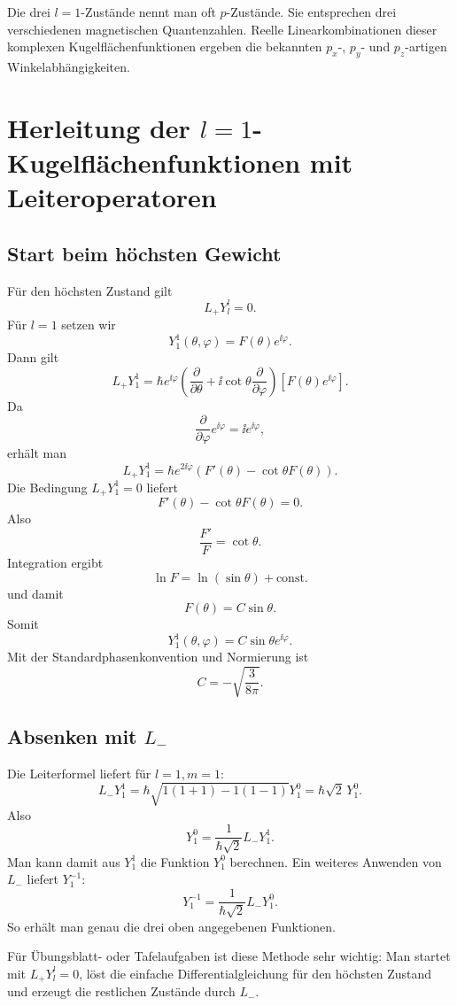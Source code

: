 \begin{notebox}
Die drei \(l=1\)-Zustände nennt man oft \(p\)-Zustände. Sie entsprechen drei verschiedenen magnetischen Quantenzahlen. Reelle Linearkombinationen dieser komplexen Kugelflächenfunktionen ergeben die bekannten \(p_x\)-, \(p_y\)- und \(p_z\)-artigen Winkelabhängigkeiten.
\end{notebox}

\section{Herleitung der \(l=1\)-Kugelflächenfunktionen mit Leiteroperatoren}

\subsection{Start beim höchsten Gewicht}

Für den höchsten Zustand gilt
\[
    L_+Y_l^l=0.
\]
Für \(l=1\) setzen wir
\[
    Y_1^1(\theta,\varphi)=F(\theta)e^{\ii\varphi}.
\]
Dann gilt
\[
    L_+Y_1^1
    =\hbar e^{\ii\varphi}\left(\frac{\partial}{\partial\theta}
    +\ii\cot\theta\frac{\partial}{\partial\varphi}\right)
    \left[F(\theta)e^{\ii\varphi}\right].
\]
Da
\[
    \frac{\partial}{\partial\varphi}e^{\ii\varphi}=\ii e^{\ii\varphi},
\]
erhält man
\[
    L_+Y_1^1
    =\hbar e^{2\ii\varphi}\left(F'(\theta)-\cot\theta F(\theta)\right).
\]
Die Bedingung \(L_+Y_1^1=0\) liefert
\[
    F'(\theta)-\cot\theta F(\theta)=0.
\]
Also
\[
    \frac{F'}{F}=\cot\theta.
\]
Integration ergibt
\[
    \ln F=\ln(\sin\theta)+\text{const.}
\]
und damit
\[
    F(\theta)=C\sin\theta.
\]
Somit
\[
    Y_1^1(\theta,\varphi)=C\sin\theta e^{\ii\varphi}.
\]
Mit der Standardphasenkonvention und Normierung ist
\[
    C=-\sqrt{\frac{3}{8\pi}}.
\]

\subsection{Absenken mit \(L_-\)}

Die Leiterformel liefert für \(l=1,m=1\):
\[
    L_-Y_1^1
    =\hbar\sqrt{1(1+1)-1(1-1)}Y_1^0
    =\hbar\sqrt2\,Y_1^0.
\]
Also
\[
    Y_1^0=\frac{1}{\hbar\sqrt2}L_-Y_1^1.
\]
Man kann damit aus \(Y_1^1\) die Funktion \(Y_1^0\) berechnen. Ein weiteres Anwenden von \(L_-\) liefert \(Y_1^{-1}\):
\[
    Y_1^{-1}=\frac{1}{\hbar\sqrt2}L_-Y_1^0.
\]
So erhält man genau die drei oben angegebenen Funktionen.

\begin{examtipbox}
Für Übungsblatt- oder Tafelaufgaben ist diese Methode sehr wichtig: Man startet mit \(L_+Y_l^l=0\), löst die einfache Differentialgleichung für den höchsten Zustand und erzeugt die restlichen Zustände durch \(L_-\).
\end{examtipbox}

